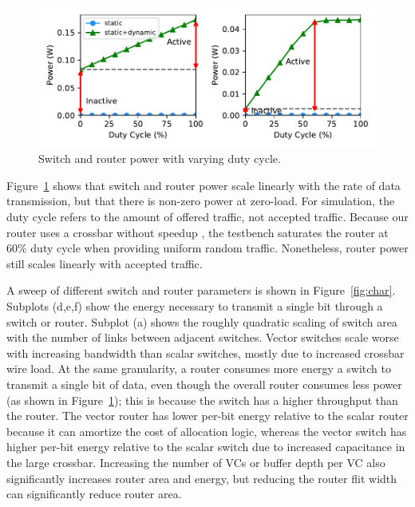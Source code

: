 
\begin{figure}
\centering
\includegraphics[width=1\columnwidth]{network/figs/sweep.pdf}
  \caption{Switch and router power with varying duty cycle.}\label{fig:sweep}
\end{figure}


Figure~\ref{fig:sweep} shows that switch and router power scale linearly with the rate of data transmission, but that there is non-zero power at zero-load. 
For simulation, the duty cycle refers to the amount of offered traffic, not accepted traffic.
Because our router uses a crossbar without speedup \cite{dallytowles}, the testbench saturates the router at 60\% duty cycle when providing uniform random traffic. 
Nonetheless, router power still scales linearly with accepted traffic.

A sweep of different switch and router parameters is shown in Figure~\ref{fig:char}. Subplots (d,e,f) show the energy necessary to transmit a single bit through a switch or router.
Subplot (a) shows the roughly quadratic scaling of switch area with the number of links between adjacent switches.
Vector switches scale worse with increasing bandwidth than scalar switches, mostly due to increased crossbar wire load. 
At the same granularity, a router consumes more energy a switch to transmit a single bit of data, even though the overall router consumes less power (as shown in Figure~\ref{fig:sweep}); 
this is because the switch has a higher throughput than the router.
The vector router has lower per-bit energy relative to the scalar router because it can amortize the cost of allocation logic, whereas the vector switch has higher per-bit energy relative to the scalar switch due to increased capacitance in the large crossbar. 
Increasing the number of VCs or buffer depth per VC also significantly increases router area and energy, but reducing the router flit width can significantly reduce router area. 

